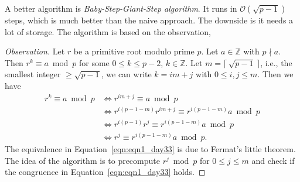 \documentclass{amsbook}
\theoremstyle{plain}
\theoremstyle{definition}
\theoremstyle{remark}
\numberwithin{equation}{chapter}
\numberwithin{figure}{chapter}
\newcommand{\Z}{\mathbb{Z}}
\begin{document}
A better algorithm is \emph{Baby-Step-Giant-Step algorithm}. It runs in $\mathcal{O}(\sqrt{p-1})$ steps, which is much better than the naive approach. The downside is it needs a lot of storage. The algorithm is based on the observation,
\begin{proof}[Observation]\renewcommand*{\qedsymbol}{}
  Let $r$ be a primitive root modulo prime $p$. Let $a \in \Z$ with $p \nmid a$. Then $r^k \equiv a \bmod p$ for some $0 \leqslant k \leqslant p - 2$, $k \in \Z$. Let $m = \lceil \, \sqrt{p-1} \, \rceil$, i.e., the smallest integer $\geqslant \sqrt{p-1}$, we can write $k = im + j$ with $0 \leqslant i, j \leqslant m$. Then we have
  \begin{align}
    r^k \equiv a \bmod p &\iff r^{im+j} \equiv a \bmod p \\
                         &\iff r^{i(p-1-m)} r^{im+j} \equiv r^{i(p-1-m)} a \bmod p \\
                         &\iff r^{i(p-1)} r^j \equiv r^{i(p-1-m)} a \bmod p \\
                         &\iff r^j \equiv r^{i(p-1-m)} a \bmod p. \label{eqn:eqn1_day33}
  \end{align}
  The equivalence in Equation~\eqref{eqn:eqn1_day33} is due to Fermat's little theorem. The idea of the algorithm is to precompute $r^j \bmod p$ for $0 \leqslant j \leqslant m$ and check if the congruence in Equation~\eqref{eqn:eqn1_day33} holds.
\end{proof}
\end{document}
